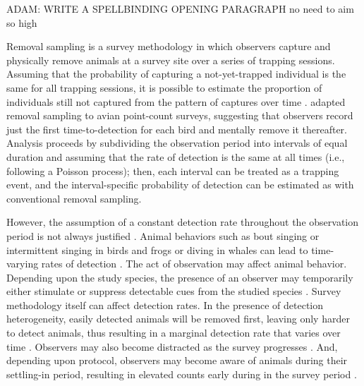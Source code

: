 \documentclass[useAMS,usenatbib,referee,12pt]{article}
\newcommand{\adam}[1]{{\color{blue} ADAM: #1}}
\newcommand{\jarad}[1]{{\color{red} #1}}
\begin{document}
\adam{WRITE A SPELLBINDING OPENING PARAGRAPH}\jarad{no need to aim so high}


Removal sampling is a survey methodology in which observers capture and physically remove animals at a survey site over a series of trapping sessions.  Assuming that the probability of capturing a not-yet-trapped individual is the same for all trapping sessions, it is possible to estimate the proportion of individuals still not captured from the pattern of captures over time \citep{Moran1951, Zippin1958, Seber1982}.  \citet{Farnsworth2002} adapted removal sampling to avian point-count surveys, suggesting that observers record just the first time-to-detection for each bird and mentally remove it thereafter.  Analysis proceeds by subdividing the observation period into intervals of equal duration and assuming that the rate of detection is the same at all times (i.e., following a Poisson process); then, each interval can be treated as a trapping event, and the interval-specific probability of detection can be estimated as with conventional removal sampling.

However, the assumption of a constant detection rate throughout the observation period is not always justified \citep{Alldredge2007}.  Animal behaviors such as bout singing or intermittent singing in birds and frogs or diving in whales can lead to time-varying rates of detection \citep{Scott2005, Diefenbach2007, Reidy2011}.  The act of observation may affect animal behavior.  Depending upon the study species, the presence of an observer may temporarily either stimulate or suppress detectable cues from the studied species \citep{McSheaRappole1997, Rosenstock2002, Alldredge2007}.  Survey methodology itself can affect detection rates.  In the presence of detection heterogeneity, easily detected animals will be removed first, leaving only harder to detect animals, thus resulting in a marginal detection rate that varies over time \citep{Farnsworth2005}.  Observers may also become distracted as the survey progresses \citep{Johnson2008}.  And, depending upon protocol, observers may become aware of animals during their settling-in period, resulting in elevated counts early during in the survey period \citep{LeeMarsden2008}.
\end{document}
